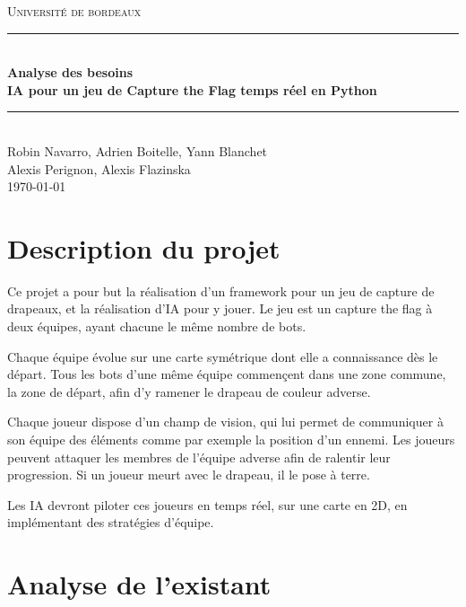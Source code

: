 \documentclass[french]{article}
\begin{document}
\begin{titlepage}
\newcommand{\HRule}{\rule{\linewidth}{0.5mm}}
\center
\textsc{\LARGE
Université de bordeaux
} \\[1cm]

\HRule \\[0.2cm]
{ \huge \bfseries Analyse des besoins \\[0.15cm] }
{ \bfseries IA pour un jeu de Capture the Flag temps réel en Python\\[0.15cm] }
\HRule \\[1.5cm]
Robin Navarro, Adrien Boitelle, Yann Blanchet\\Alexis Perignon, Alexis Flazinska
\\[1cm]
\today \\ [1cm]
\end{titlepage}

\newpage
\Large
\tableofcontents


\normalsize
\newpage
\section{Description du projet}

Ce projet a pour but la réalisation d'un framework pour un jeu de capture de drapeaux, et la réalisation d'IA pour y jouer.
Le jeu est un capture the flag à deux équipes, ayant chacune le même nombre de bots.
\newline

Chaque équipe évolue sur une carte symétrique dont elle a connaissance dès le départ. Tous les bots d'une même équipe commençent dans une zone commune, la zone de départ, afin d'y ramener le drapeau de couleur adverse.
\newline

Chaque joueur dispose d'un champ de vision, qui lui permet de communiquer à son équipe des éléments comme par exemple la position d'un ennemi. Les joueurs peuvent attaquer les membres de l'équipe adverse afin de ralentir leur progression. Si un joueur meurt avec le drapeau, il le pose à terre.
\newline

Les IA devront piloter ces joueurs en temps réel, sur une carte en 2D, en implémentant des stratégies d'équipe.


\section{Analyse de l'existant}
    
\end{document}
